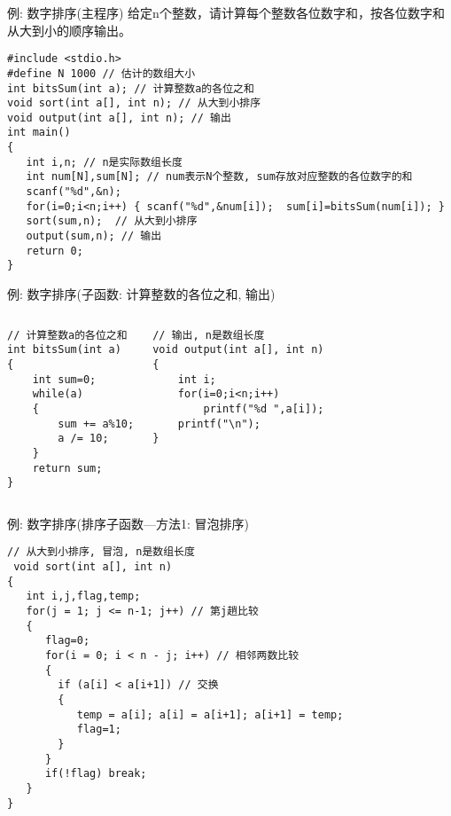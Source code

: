 \begin{frame}{例: 数字排序(主程序)}
给定n个整数，请计算每个整数各位数字和，按各位数字和从大到小的顺序输出。
\begin{lstlisting}
#include <stdio.h>
#define N 1000 // 估计的数组大小
int bitsSum(int a); // 计算整数a的各位之和
void sort(int a[], int n); // 从大到小排序
void output(int a[], int n); // 输出
int main()
{
   int i,n; // n是实际数组长度 
   int num[N],sum[N]; // num表示N个整数, sum存放对应整数的各位数字的和  
   scanf("%d",&n);
   for(i=0;i<n;i++) { scanf("%d",&num[i]);  sum[i]=bitsSum(num[i]); }
   sort(sum,n);  // 从大到小排序
   output(sum,n); // 输出
   return 0;
}
\end{lstlisting}
\end{frame}

\begin{frame}{例: 数字排序(子函数: 计算整数的各位之和, 输出)}
\begin{columns}[T]
\begin{lstlisting}
// 计算整数a的各位之和
int bitsSum(int a)
{
	int sum=0;
	while(a)
	{
		sum += a%10;
		a /= 10;
	}
	return sum;
}
\end{lstlisting}
\begin{lstlisting}[frame=leftline]
// 输出, n是数组长度
void output(int a[], int n)
{
	int i;
	for(i=0;i<n;i++) 
		printf("%d ",a[i]);
	printf("\n");
}
\end{lstlisting}
\end{columns}
\end{frame}

\begin{frame}{例: 数字排序(排序子函数---方法1: 冒泡排序)}
\begin{lstlisting}
// 从大到小排序, 冒泡, n是数组长度
 void sort(int a[], int n)
{
   int i,j,flag,temp;
   for(j = 1; j <= n-1; j++) // 第j趟比较
   {
      flag=0;
      for(i = 0; i < n - j; i++) // 相邻两数比较
      {
        if (a[i] < a[i+1]) // 交换
        { 
           temp = a[i]; a[i] = a[i+1]; a[i+1] = temp; 
           flag=1;
        }
      }
      if(!flag) break;
   }
}
\end{lstlisting}
\end{frame}

